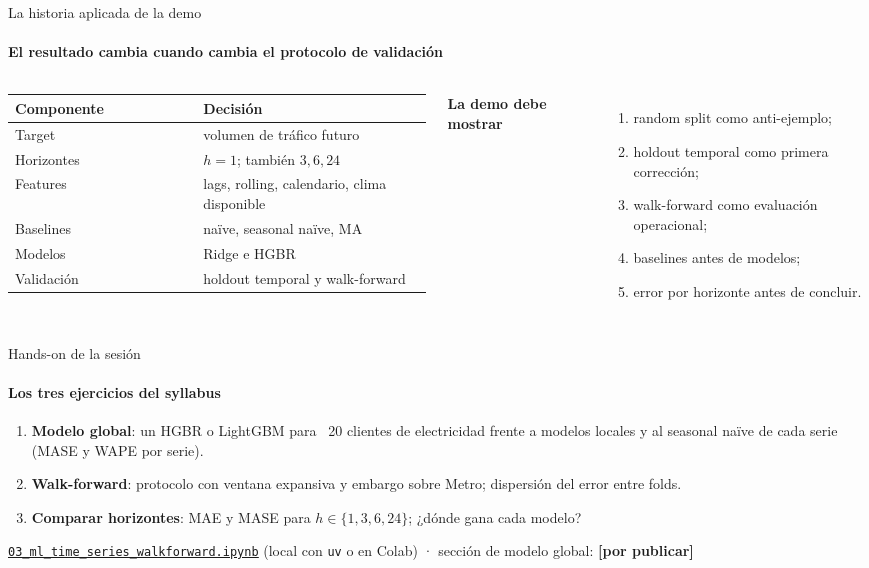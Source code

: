 \documentclass[aspectratio=169,11pt]{beamer}  %
\newcommand{\hrow}{\rowcolor{mlcream}}
\newcommand{\pend}[1]{\textcolor{mlred}{\textbf{[#1]}}}
\begin{document}
\begin{frame}{La historia aplicada de la demo}
\framesubtitle{El resultado cambia cuando cambia el protocolo de validación}
\begin{columns}[T]
\centering\footnotesize
\begin{tabular}{@{}l P{0.55\linewidth}@{}}
\toprule
\hrow \textbf{Componente} & Decisión\\
\midrule
Target & volumen de tráfico futuro\\
Horizontes & $h = 1$; también $3, 6, 24$\\
Features & lags, rolling, calendario, clima disponible\\
Baselines & naïve, seasonal naïve, MA\\
Modelos & Ridge e HGBR\\
Validación & holdout temporal y walk-forward\\
\bottomrule
\end{tabular}
\textbf{La demo debe mostrar}
\begin{enumerate}\small
\item random split como anti-ejemplo;
\item holdout temporal como primera corrección;
\item walk-forward como evaluación operacional;
\item baselines antes de modelos;
\item error por horizonte antes de concluir.
\end{enumerate}
\end{columns}
\end{frame}

\begin{frame}{Hands-on de la sesión}
\framesubtitle{Los tres ejercicios del syllabus}
\begin{enumerate}
\item \textbf{Modelo global}: un HGBR o LightGBM para ~20 clientes de electricidad frente a modelos locales y al seasonal naïve de cada serie (MASE y WAPE por serie).
\item \textbf{Walk-forward}: protocolo con ventana expansiva y embargo sobre Metro; dispersión del error entre folds.
\item \textbf{Comparar horizontes}: MAE y MASE para $h \in \{1, 3, 6, 24\}$; ¿dónde gana cada modelo?
\end{enumerate}
\vspace{4pt}
\begin{toolbox}[Notebook]
\href{https://github.com/anvasquezre/EAFIT_AA_2026-02/blob/main/notebooks/03_ml_time_series_walkforward.ipynb}{\textcolor{eafitneon}{\underline{\texttt{03\_ml\_time\_series\_walkforward.ipynb}}}} (local con \texttt{uv} o en Colab) · sección de modelo global: \pend{por publicar}
\end{toolbox}
\end{frame}
\end{document}
